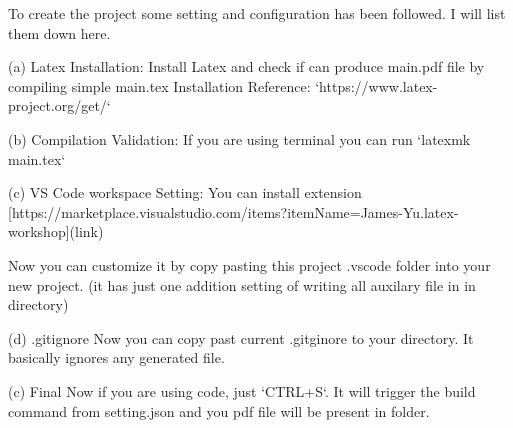 


\begin{text-note}

To create the project some setting and configuration has been followed. I will list them down here.

(a) Latex Installation: Install Latex and check if can produce main.pdf file by compiling simple main.tex
Installation Reference: `https://www.latex-project.org/get/`

(b) Compilation Validation: If you are using terminal you can run `latexmk main.tex` 

(c) VS Code workspace Setting: 
You can install extension [https://marketplace.visualstudio.com/items?itemName=James-Yu.latex-workshop](link)

Now you can customize it by copy pasting this project .vscode folder into your new project.
(it has just one addition setting of writing all auxilary file in in  \out directory)

(d) .gitignore
Now you can copy past current .gitginore to your directory.
It basically ignores any generated file.

(c) Final
Now if you are using code, just `CTRL+S`.
It will trigger the build command from setting.json and you pdf file will be present in \out folder.


\end{text-note}

